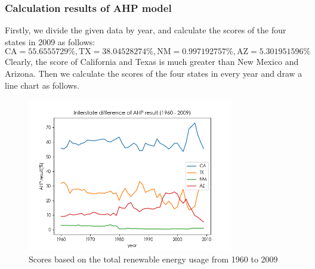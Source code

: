 \documentclass[a4paper,11pt]{article}
\begin{document}
\subsubsection{Calculation results of AHP model}
\par Firstly, we divide the given data by year, and calculate the scores of the four states in 2009 as follows:
\[
    \text{CA}=55.6555729\%, \text{TX}=38.04528274\%, \text{NM}=0.997192757\%, \text{AZ}=5.301951596\%
\]
Clearly, the score of California and Texas is much greater than New Mexico and Arizona.
Then we calculate the scores of the four states in every year and draw a line chart as follows.
\begin{figure}[!hptb] 
    \centering 
    \includegraphics[width=0.8\textwidth]{./Pic/B-level-predict.png}
    \caption{Scores based on the total renewable energy usage from 1960 to 2009}
    \label{fig:B-level-predict}
\end{figure}

\end{document}
